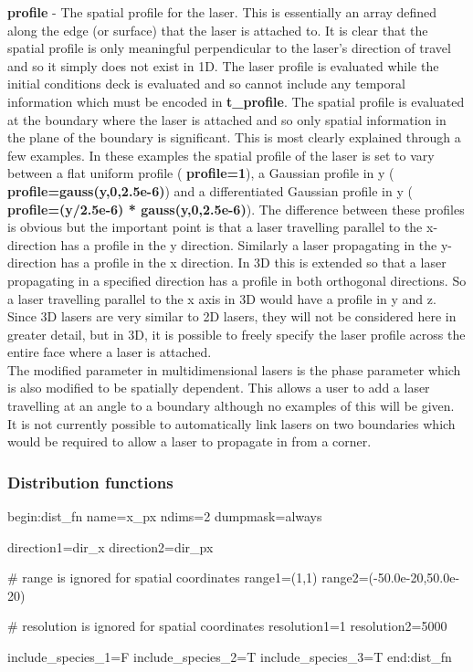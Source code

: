 \documentclass[12pt,a4paper]{article}
\newcommand{\emphtext}{\color{warwickdark} \fontfamily{phv}\selectfont\Large\bf}
\newcommand{\inlineemph}[1]{{\color{warwicklight} \bf{#1}}}
\newenvironment{nbboxverbatim}[1]{
\noindent\minipage{\textwidth}
\setlength{\FrameSep}{0pt}
\def\FrameCommand{\fboxsep=0pt \colorbox{shadecolor}}
\MakeFramed{\FrameRestore}
\fvset{label=#1}
\boxverb
}{
\endboxverb
\vspace{-13.5pt}
\endMakeFramed
\endminipage
\vspace{5pt}
}
\begin{document}
{\emphtext profile} - The spatial profile for the laser. This is
essentially an array defined along the edge (or surface) that the laser is
attached to. It is clear that the spatial profile is only meaningful
perpendicular to the laser's direction of travel and so it simply does not
exist in 1D. The laser profile is evaluated while the initial conditions deck
is evaluated and so cannot include any temporal information which must be
encoded in \inlineemph{t\_profile}.  The spatial profile is evaluated at the
boundary where the laser is attached and so only spatial information in the
plane of the boundary is significant. This is most clearly explained through a
few examples. In these examples the spatial profile of the laser is set to vary
between a flat uniform profile (\inlineemph{profile=1}), a Gaussian profile in
y (\inlineemph{profile=gauss(y,0,2.5e-6)}) and a differentiated Gaussian
profile in y (\inlineemph{profile=(y/2.5e-6) * gauss(y,0,2.5e-6)}). The
difference between these profiles is obvious but the important point is that a
laser travelling parallel to the x-direction has a profile in the y
direction. Similarly a laser propagating in the y-direction has a profile in
the x direction. In 3D this is extended so that a laser propagating in a
specified direction has a profile in both orthogonal directions. So a laser
travelling parallel to the x axis in 3D would have a profile in y and z. Since
3D lasers are very similar to 2D lasers, they will not be considered here in
greater detail, but in 3D, it is possible to freely specify the laser profile
across the entire face where a laser is attached.\\

The modified parameter in
multidimensional lasers is the phase parameter which is also modified to
be spatially dependent. This allows a user to add a laser travelling at an
angle to a boundary although no examples of this will be given. It is not
currently possible to automatically link lasers on two boundaries which
would be required to allow a laser to propagate in from a corner.\\

\subsubsection{Distribution functions}
%
\begin{nbboxverbatim}{dist\_fn block}
begin:dist_fn
   name=x_px
   ndims=2
   dumpmask=always

   direction1=dir_x
   direction2=dir_px

   # range is ignored for spatial coordinates
   range1=(1,1)
   range2=(-50.0e-20,50.0e-20)

   # resolution is ignored for spatial coordinates
   resolution1=1
   resolution2=5000

   include_species_1=F
   include_species_2=T
   include_species_3=T
end:dist_fn
\end{nbboxverbatim}
\end{document}
